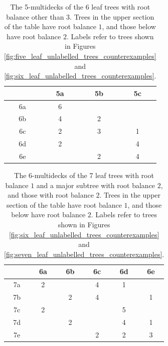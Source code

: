 \documentclass[12pt]{article}
\theoremstyle{definition}
\begin{document}
\begin{table}
    \begin{center}
        \begin{tabular}{c||c|c|c|}
             & 5a & 5b & 5c \\
             \hline \hline
             6a & 6 & & \\
             \hline
             6b & 4 & 2 & \\
             \hline
             6c & 2 & 3 & 1 \\
             \hline \hline
             6d & 2 & & 4 \\
             \hline
             6e & & 2 & 4 \\
             \hline
        \end{tabular}
    \end{center}
    \caption{The 5-multidecks of the 6 leaf trees with root balance other than $3$. Trees in the upper section of the table have root balance $1$, and those below have root balance $2$. Labels refer to trees shown in Figures \ref{fig:five_leaf_unlabelled_trees_counterexamples} and \ref{fig:six_leaf_unlabelled_trees_counterexamples}.}
    \label{table:six_leaf_subtrees}
\end{table}

\begin{table}
    \begin{center}
        \begin{tabular}{c||c|c|c|c|c|}
             & 6a & 6b & 6c & 6d & 6e \\
             \hline \hline
             7a & 2 & & 4 & 1 & \\
             \hline
             7b & & 2 & 4 & & 1 \\
             \hline \hline
             7c & 2 & & & 5 & \\
             \hline
             7d & & 2 & & 4 & 1 \\
             \hline
             7e & & & 2 & 2 & 3 \\
             \hline
        \end{tabular}
    \end{center}
    \caption{The 6-multidecks of the 7 leaf trees with root balance $1$ and a major subtree with root balance $2$, and those with root balance $2$. Trees in the upper section of the table have root balance $1$, and those below have root balance $2$. Labels refer to trees shown in Figures \ref{fig:six_leaf_unlabelled_trees_counterexamples} and \ref{fig:seven_leaf_unlabelled_trees_counterexamples}.}
    \label{table:seven_leaf_subtrees}
\end{table}
\end{document}
